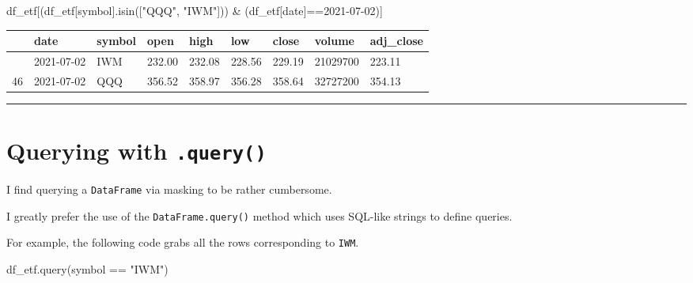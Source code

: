 \documentclass[
  letterpaper,
  DIV=11,
  numbers=noendperiod]{scrreprt}
\newenvironment{Shaded}{\begin{snugshade}}{\end{snugshade}}
\newcommand{\NormalTok}[1]{\textcolor[rgb]{0.00,0.23,0.31}{#1}}
\newcommand{\OperatorTok}[1]{\textcolor[rgb]{0.37,0.37,0.37}{#1}}
\newcommand{\StringTok}[1]{\textcolor[rgb]{0.13,0.47,0.30}{#1}}
\begin{document}
\begin{Shaded}
\begin{Highlighting}[]
\NormalTok{df\_etf[(df\_etf[}\StringTok{\textquotesingle{}symbol\textquotesingle{}}\NormalTok{].isin([}\StringTok{"QQQ"}\NormalTok{, }\StringTok{"IWM"}\NormalTok{])) }\OperatorTok{\&}\NormalTok{ (df\_etf[}\StringTok{\textquotesingle{}date\textquotesingle{}}\NormalTok{]}\OperatorTok{==}\StringTok{\textquotesingle{}2021{-}07{-}02\textquotesingle{}}\NormalTok{)]}
\end{Highlighting}
\end{Shaded}

\begin{longtable}[]{@{}lllllllll@{}}
\toprule\noalign{}
& date & symbol & open & high & low & close & volume & adj\_close \\
\midrule\noalign{}
\endhead
\bottomrule\noalign{}
\endlastfoot
24 & 2021-07-02 & IWM & 232.00 & 232.08 & 228.56 & 229.19 & 21029700 &
223.11 \\
46 & 2021-07-02 & QQQ & 356.52 & 358.97 & 356.28 & 358.64 & 32727200 &
354.13 \\
\end{longtable}

\begin{center}\rule{0.5\linewidth}{0.5pt}\end{center}

\hypertarget{querying-with-.query}{%
\section{\texorpdfstring{Querying with
\texttt{.query()}}{Querying with .query()}}\label{querying-with-.query}}

I find querying a \texttt{DataFrame} via masking to be rather
cumbersome.

I greatly prefer the use of the \texttt{DataFrame.query()} method which
uses SQL-like strings to define queries.

For example, the following code grabs all the rows corresponding to
\texttt{IWM}.

\begin{Shaded}
\begin{Highlighting}[]
\NormalTok{df\_etf.query(}\StringTok{\textquotesingle{}symbol == "IWM"\textquotesingle{}}\NormalTok{)}
\end{Highlighting}
\end{Shaded}
\end{document}
